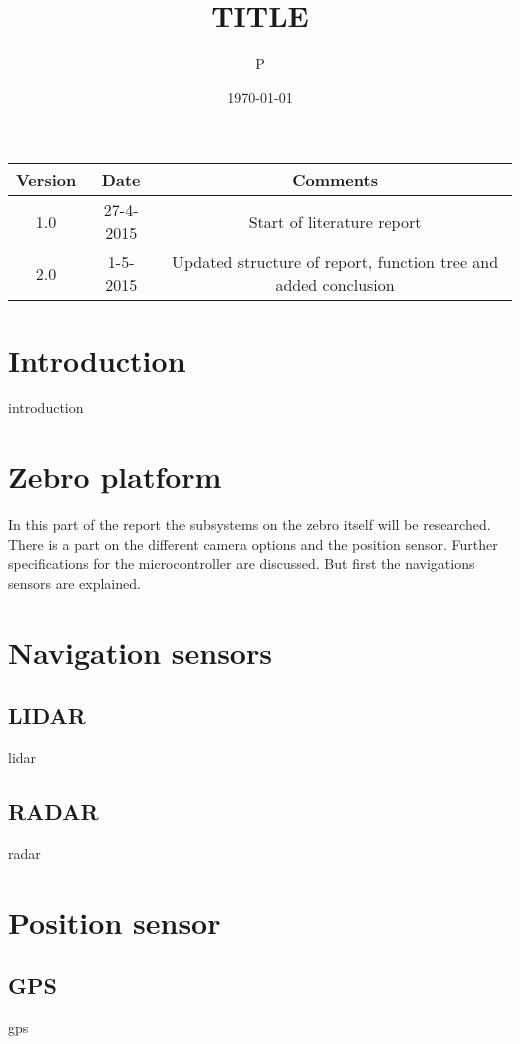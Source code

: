 \documentclass[parskip=full,11pt,a4paper,titlepage]{article}
\title{TITLE}
\author{P}
\date{\today}
\begin{document}



\clearpage

\begin{center}
\begin{tabular}{|c|c|c|}
\hline
	Version	& Date & Comments \\
\hline
	1.0		& 27-4-2015 & Start of literature report \\
\hline
	2.0		& 1-5-2015	& Updated structure of report, function tree and added conclusion \\
\hline
\end{tabular}
\end{center}
\clearpage



\tableofcontents
\clearpage

\section{Introduction}
{introduction}
\clearpage

\section{Zebro platform}

In this part of the report the subsystems on the zebro itself will be researched. There is a part on the different camera options and the position sensor. Further specifications for the microcontroller are discussed. But first the navigations sensors are explained.

\section{Navigation sensors}
\subsection{LIDAR}
{lidar}
\clearpage

\subsection{RADAR}
{radar}

\section{Position sensor}
\subsection{GPS}
{gps}
\clearpage
\end{document}
